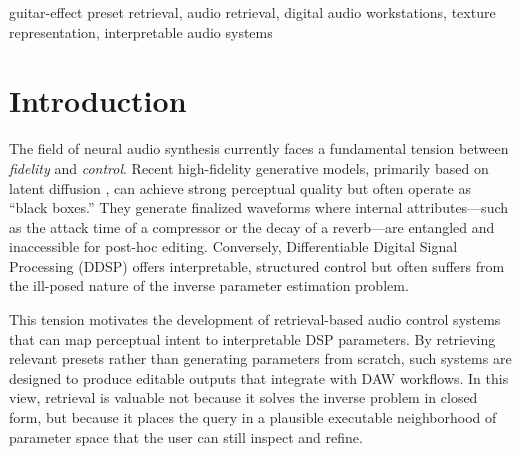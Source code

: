 \maketitle

\begin{abstract}
Digital audio workstations expose rich effect chains, but mapping perceptual intent to editable low-level parameters remains ill-posed. We study retrieval-grounded guitar-effect preset selection, where the system returns an executable plugin configuration rather than a finalized waveform. Our method, Texture Resonance Retrieval (TRR), represents audio with Gram matrices of projected mid-level Wav2Vec2 activations to capture texture-relevant co-activation structure. On an audited 204-query guitar-effect benchmark with 1,063 candidate presets, TRR improves retrieval over selected audio embedding baselines, while mechanism ablations and near-duplicate sensitivity analyses define the robustness boundary of this result. A supervised regression boundary, listening study, and local vLLM diagnostic further show that parameter-space alignment should not be treated as a direct proxy for human perceptual preference.
\end{abstract}

\begin{IEEEkeywords}
guitar-effect preset retrieval, audio retrieval, digital audio workstations, texture representation, interpretable audio systems
\end{IEEEkeywords}

\section{Introduction}
\label{sec:introduction}

	The field of neural audio synthesis currently faces a fundamental tension between \textit{fidelity} and \textit{control}. Recent high-fidelity generative models, primarily based on latent diffusion \citep{liu2023audioldm,agostinelli2023musiclm}, can achieve strong perceptual quality but often operate as ``black boxes.'' They generate finalized waveforms where internal attributes—such as the attack time of a compressor or the decay of a reverb—are entangled and inaccessible for post-hoc editing. Conversely, Differentiable Digital Signal Processing (DDSP) \citep{engel2020ddsp} offers interpretable, structured control but often suffers from the ill-posed nature of the inverse parameter estimation problem.

This tension motivates the development of retrieval-based audio control systems that can map perceptual intent to interpretable DSP parameters. By retrieving relevant presets rather than generating parameters from scratch, such systems are designed to produce editable outputs that integrate with DAW workflows. In this view, retrieval is valuable not because it solves the inverse problem in closed form, but because it places the query in a plausible executable neighborhood of parameter space that the user can still inspect and refine.

